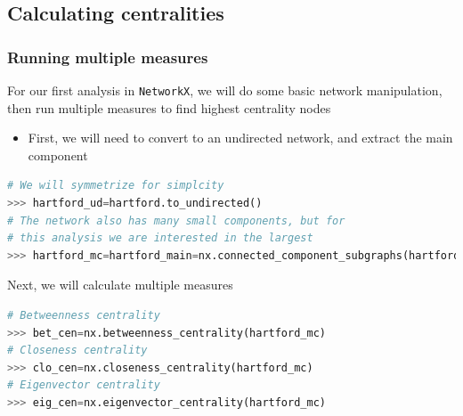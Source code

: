 \documentclass[xcolor=dvipsnames, 9pt]{beamer}
\begin{document}
\subsection{Calculating centralities} %
\label{sub:calculating_centralities}

\begin{frame}[fragile]
    \frametitle{Running multiple measures}
    For our first analysis in \texttt{NetworkX}, we will do some basic network manipulation, then run multiple measures to find highest centrality nodes
    \begin{itemize}
        \item First, we will need to convert to an undirected network, and extract the main component
    \end{itemize}
    \begin{block}{}
        \scriptsize{\begin{lstlisting}[language=Python]
# We will symmetrize for simplcity
>>> hartford_ud=hartford.to_undirected()
# The network also has many small components, but for
# this analysis we are interested in the largest
>>> hartford_mc=hartford_main=nx.connected_component_subgraphs(hartford_ud)[0]
        \end{lstlisting}}
    \end{block}
    Next, we will calculate multiple measures
    \begin{block}{}
        \scriptsize{\begin{lstlisting}[language=Python]
# Betweenness centrality
>>> bet_cen=nx.betweenness_centrality(hartford_mc)
# Closeness centrality
>>> clo_cen=nx.closeness_centrality(hartford_mc)
# Eigenvector centrality
>>> eig_cen=nx.eigenvector_centrality(hartford_mc)
        \end{lstlisting}}
    \end{block}
\end{frame}
\end{document}
